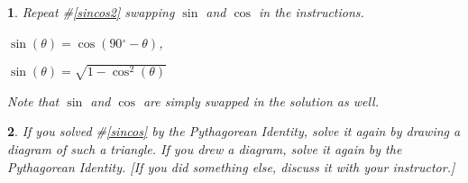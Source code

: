\documentclass{amsbook}
\newtheorem{exc}{}
\newenvironment{ex}{\begin{exc}\normalfont}{\end{exc}}
\numberwithin{section}{chapter}
\numberwithin{equation}{chapter}
\newcommand{\dg}{{^\circ}}
\begin{document}
\begin{ex}
	Repeat \#\ref{sincos2} swapping $\sin$ and $\cos$ in the instructions.
		\begin{sol}
		$\sin(\theta) = \cos(90\dg-\theta)$,
		
		$\sin(\theta) = \sqrt{1-\cos^2(\theta)}$
		
		Note that $\sin$ and $\cos$ are simply swapped in the solution as well.
	\end{sol}
\end{ex}

\begin{ex}
	If you solved \#\ref{sincos} by the Pythagorean Identity, solve it again by drawing a diagram of such a triangle. If you drew a diagram, solve it again by the Pythagorean Identity. [If you did something else, discuss it with your instructor.]
\end{ex}
\end{document}
